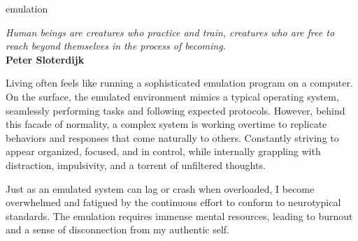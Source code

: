 



\begin{center}
\vspace*{\fill}
\Huge emulation

\vspace{2cm}

\begin{flushright}
\large
\textit{ Human beings are creatures who practice and train, creatures who are free to reach beyond themselves in the process of becoming.}\\
\textbf{ Peter Sloterdijk }
\end{flushright}

\vspace*{\fill}
\end{center}

\normalsize

Living often feels like running a sophisticated emulation program on a computer. On the surface, the emulated environment mimics a typical operating system, seamlessly performing tasks and following expected protocols. However, behind this facade of normality, a complex system is working overtime to replicate behaviors and responses that come naturally to others. Constantly striving to appear organized, focused, and in control, while internally grappling with distraction, impulsivity, and a torrent of unfiltered thoughts.

Just as an emulated system can lag or crash when overloaded, I become overwhelmed and fatigued by the continuous effort to conform to neurotypical standards. The emulation requires immense mental resources, leading to burnout and a sense of disconnection from my authentic self.
